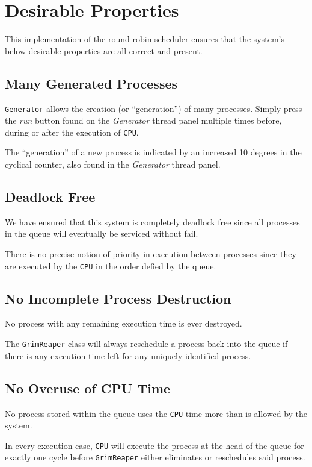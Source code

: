 \documentclass[]{report}
\begin{document}
\newpage 

\section*{Desirable Properties}
This implementation of the round robin scheduler ensures that the system's below desirable properties are all correct and present.

\subsection*{Many Generated Processes}
\verb|Generator| allows the creation (or ``generation'') of many processes. Simply press the \textit{run} button found on the \textit{Generator} thread panel multiple times before, during or after the execution of \verb|CPU|. \par 
The ``generation'' of a new process is indicated by an increased 10 degrees in the cyclical counter, also found in the \textit{Generator} thread panel. 

\vspace{2mm}

\subsection*{Deadlock Free}
We have ensured that this system is completely deadlock free since all processes in the queue will eventually be serviced without fail. \par 
There is no precise notion of priority in execution between processes since they are executed by the \verb|CPU| in the order defied by the queue.

\vspace{2mm}

\subsection*{No Incomplete Process Destruction}
No process with any remaining execution time is ever destroyed. \par 
The \verb|GrimReaper| class will always reschedule a process back into the queue if there is any execution time left for any uniquely identified process.

\vspace{2mm}

\subsection*{No Overuse of CPU Time}
No process stored within the queue uses the \verb|CPU| time more than is allowed by the system. \par 
In every execution case, \verb|CPU| will execute the process at the head of the queue for exactly one cycle before \verb|GrimReaper| either eliminates or reschedules said process. 
\end{document}

